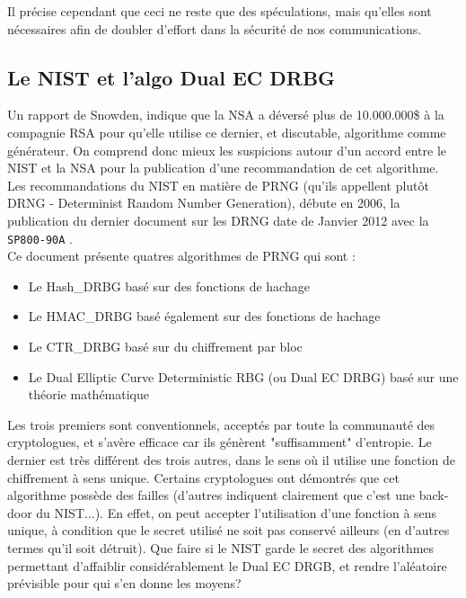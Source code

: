 	Il précise cependant que ceci ne reste que des spéculations, mais
	qu'elles sont nécessaires afin de doubler d'effort dans la sécurité
	de nos communications.\\


	\subsection{Le NIST et l'algo Dual EC DRBG}
	
	Un rapport de Snowden, indique que la NSA a déversé plus de 10.000.000\$ à 
	la compagnie RSA \cite{ravi2013NSA} pour qu'elle utilise ce dernier, 
	et discutable, algorithme comme générateur. On comprend donc mieux les suspicions autour d'un accord entre le NIST et 
	la NSA pour la publication d'une recommandation de cet algorithme.\\	
	
	Les recommandations du NIST en matière de PRNG (qu'ils appellent plutôt 
	DRNG - Determinist Random Number Generation), débute en 2006, la 
	publication du dernier document sur les DRNG date de Janvier 2012 avec la 
	\texttt{SP800-90A} \cite{nist800-90A}.\\

	Ce document présente quatres algorithmes de PRNG qui sont :
	\begin{itemize}
		\item Le Hash\_DRBG basé sur des fonctions de hachage
		\item Le HMAC\_DRBG basé également sur des fonctions de hachage
		\item Le CTR\_DRBG basé sur du chiffrement par bloc
		\item Le Dual Elliptic Curve Deterministic RBG (ou Dual EC DRBG) basé 
		sur une théorie mathématique\\
	\end{itemize}

	Les trois premiers sont conventionnels, acceptés par toute la communauté 
	des cryptologues, et s'avère efficace car ils génèrent "suffisamment" 
	d'entropie. 	Le dernier est très différent des trois autres, dans le sens où il utilise 
	une fonction de chiffrement à sens unique. Certains cryptologues ont 
	démontrés que cet algorithme possède des failles (d'autres indiquent 
	clairement que c'est une back-door du NIST...). En effet, on peut accepter l'utilisation d'une fonction à sens unique, à 
	condition que le secret utilisé ne soit pas conservé ailleurs (en d'autres 
	termes qu'il soit détruit). 	Que faire si le NIST garde le secret des algorithmes permettant 
	d'affaiblir considérablement le Dual EC DRGB, et rendre l'aléatoire 
	prévisible pour qui s'en donne les moyens?\\

